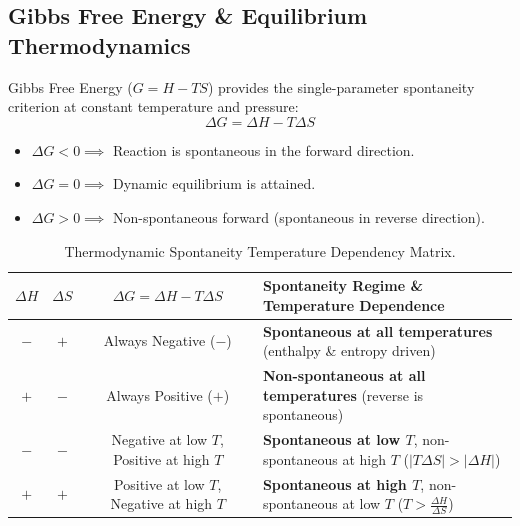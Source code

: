 \documentclass[10pt,twoside,openright]{book}
\begin{document}
\subsection{Gibbs Free Energy \& Equilibrium Thermodynamics}
Gibbs Free Energy ($G = H - TS$) provides the single-parameter spontaneity criterion at constant temperature and pressure:
\begin{equation}
  \Delta G = \Delta H - T \Delta S
\end{equation}
\begin{itemize}
  \item $\Delta G < 0 \implies$ Reaction is spontaneous in the forward direction.
  \item $\Delta G = 0 \implies$ Dynamic equilibrium is attained.
  \item $\Delta G > 0 \implies$ Non-spontaneous forward (spontaneous in reverse direction).
\end{itemize}

\begin{table}[htbp]
\centering
\small
\renewcommand{\arraystretch}{1.3}
\begin{tabularx}{\textwidth}{c c c L}
\toprule
$\Delta H$ & $\Delta S$ & $\Delta G = \Delta H - T\Delta S$ & \textbf{Spontaneity Regime \& Temperature Dependence} \\
\midrule
$-$ & $+$ & Always Negative ($-$) & \textbf{Spontaneous at all temperatures} (enthalpy \& entropy driven) \\
$+$ & $-$ & Always Positive ($+$) & \textbf{Non-spontaneous at all temperatures} (reverse is spontaneous) \\
$-$ & $-$ & Negative at low $T$, Positive at high $T$ & \textbf{Spontaneous at low $T$}, non-spontaneous at high $T$ ($|T\Delta S| > |\Delta H|$) \\
$+$ & $+$ & Positive at low $T$, Negative at high $T$ & \textbf{Spontaneous at high $T$}, non-spontaneous at low $T$ ($T > \frac{\Delta H}{\Delta S}$) \\
\bottomrule
\end{tabularx}
\caption{Thermodynamic Spontaneity Temperature Dependency Matrix.}
\end{table}
\end{document}
